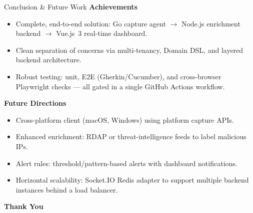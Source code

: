 \documentclass[aspectratio=169]{beamer}
\begin{document}
\begin{frame}{Conclusion \& Future Work}
    \textbf{Achievements}
    \begin{itemize}
        \item Complete, end-to-end solution: Go capture agent $\to$ Node.js enrichment
              backend $\to$ Vue.js~3 real-time dashboard.
        \item Clean separation of concerns via multi-tenancy, Domain DSL, and layered
              backend architecture.
        \item Robust testing: unit, E2E (Gherkin/Cucumber), and cross-browser Playwright
              checks --- all gated in a single GitHub Actions workflow.
    \end{itemize}
    \vspace{0.3cm}
    \textbf{Future Directions}
    \begin{itemize}
        \item Cross-platform client (macOS, Windows) using platform capture APIs.
        \item Enhanced enrichment: RDAP or threat-intelligence feeds to label malicious IPs.
        \item Alert rules: threshold/pattern-based alerts with dashboard notifications.
        \item Horizontal scalability: Socket.IO Redis adapter to support multiple backend
              instances behind a load balancer.
    \end{itemize}
\end{frame}

\begin{frame}
    \centering
    \Huge \textbf{Thank You}
\end{frame}
\end{document}
